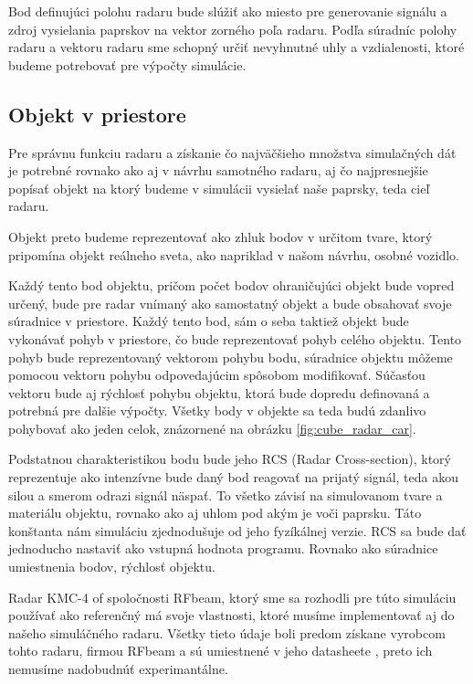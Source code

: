 \documentclass[slovak]{ExcelAtFIT} %
\begin{document}
    Bod definujúci polohu radaru bude slúžiť ako miesto pre generovanie signálu a zdroj vysielania paprskov na vektor zorného poľa radaru. Podľa súradníc polohy radaru a vektoru radaru sme schopný určiť nevyhnutné uhly a vzdialenosti, ktoré budeme potrebovať pre výpočty simulácie.

  \subsection{Objekt v priestore}
    
    \hspace{0.6cm}Pre správnu funkciu radaru a získanie čo najväčšieho množstva simulačných dát je potrebné rovnako ako aj v návrhu samotného radaru, aj čo najpresnejšie popísať objekt na ktorý budeme v simulácii vysielať naše paprsky, teda cieľ radaru. 

    Objekt preto budeme reprezentovať ako zhluk bo\-dov v určitom tvare, ktorý pripomína objekt reálneho sveta, ako napriklad v našom návrhu, osobné vozidlo.

    Každý tento bod objektu, pričom počet bodov ohraničujúci objekt bude vopred určený, bude pre radar vnímaný ako samostatný objekt a bude obsahovať svoje súradnice v priestore.
    Každý tento bod, sám o seba taktiež objekt bude vykonávať pohyb v priestore, čo bude reprezentovať pohyb celého objektu. Tento pohyb bude reprezentovaný vektorom pohybu bodu, súradnice objektu môžeme pomocou vektoru pohybu odpovedajúcim spôsobom modifikovať.
    Súčasťou vektoru bude aj rýchlosť pohybu objektu, ktorá bude dopredu definovaná a potrebná pre dalšie výpočty. 
    Všetky body v objekte sa teda budú zdanlivo pohybovať ako jeden celok, znázornené na obrázku \ref{fig:cube_radar_car}.

    Podstatnou charakteristikou bodu bude jeho RCS (Radar Cross-section), ktorý reprezentuje ako intenzív\-ne bude daný bod reagovať na prijatý signál, teda akou silou a smerom odrazi signál näspať. To všetko závisí na simulovanom tvare a materiálu objektu, rovnako ako aj uhlom pod akým je voči paprsku. Táto konštanta nám simuláciu zjednodušuje od jeho fyzíkálnej verzie. RCS sa bude dať jednoducho nastaviť ako vstupná hodnota programu. Rovnako ako súradnice umiestnenia bodov, rýchlosť objektu.

	  \hspace{0.6cm}Radar KMC-4 of spoločnosti RFbeam, ktorý sme sa rozhodli pre túto simuláciu používať ako referenčný má svoje vlastnosti, ktoré musíme implementovať aj do našeho simuláčného radaru. Všetky tieto údaje boli predom získane vyrobcom tohto radaru, firmou RFbeam a sú umiestnené v jeho datasheete \cite{kmc4sheet}, preto ich nemusíme nadobudnúť experimantálne.
\end{document}

